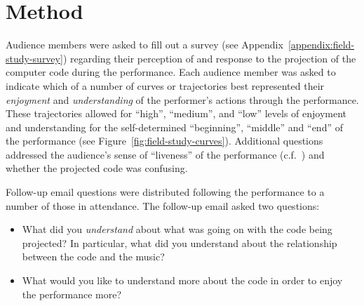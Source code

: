 \section{Method}

Audience members were asked to fill out a survey (see Appendix~\ref{appendix:field-study-survey}) regarding their perception of and response to the projection of the computer code during the performance. Each audience member was asked to indicate which of a number of curves or trajectories best represented their \emph{enjoyment} and \emph{understanding} of the performer's actions through the performance. These trajectories allowed for ``high'', ``medium'', and ``low'' levels of enjoyment and understanding for the self-determined ``beginning'', ``middle'' and ``end'' of the performance (see Figure~\ref{fig:field-study-curves}). Additional questions addressed the audience's sense of ``liveness'' of the performance (c.f.~\cite{Auslander}) and whether the projected code was confusing.

Follow-up email questions were distributed following the performance to a number of those in attendance. The follow-up email asked two questions: 
\begin{itemize}
\item What did you \emph{understand} about what was going on with the code being projected? In particular, what did you understand about the relationship between the code and the music? 
\item What would you like to understand more about the code in order to enjoy the performance more? 
\end{itemize}

